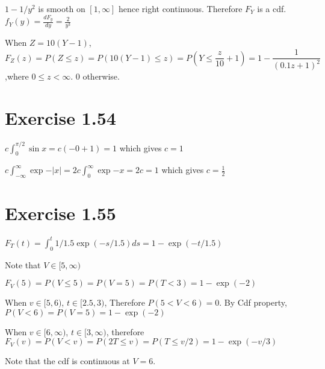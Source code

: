 \documentclass[12pt]{article}
\begin{document}
$1 - 1/y^2$ is smooth on $[1,\infty]$ hence right continuous. Therefore $F_Y$ is a cdf.\\

$f_Y(y) = \frac{d F_y}{dy} = \frac{2}{y^3}$

When $Z=10(Y-1)$, $$F_Z(z) = P(Z\leq z) = P(10(Y-1) \leq z) = P(Y \leq \frac{z}{10} + 1) = 1 - \frac{1}{(0.1z + 1)^2}$$ ,where $0 \leq z < \infty$. 0 otherwise. 

\section*{Exercise 1.54}
$c \int_0^{\pi/2}\sin{x} = c(- 0 + 1) = 1$ which gives $c = 1$

$c \int_{-\infty}^{\infty} \exp{-|x|} = 2c \int_{0}^{\infty}\exp{-x} = 2c  = 1$ which gives $c = \frac{1}{2}$

\section*{Exercise 1.55}
$F_T(t) = \int_{0}^{t} 1/1.5 \exp(-s/1.5)ds = 1 - \exp(-t/1.5)$

Note that $V\in [5, \infty)$

$F_V(5) = P(V \leq 5)= P(V = 5) = P(T < 3) = 1 -\exp(-2)$

When $v \in [5, 6)$,  $t \in [2.5, 3)$, Therefore $P(5 < V < 6) = 0$. By Cdf property, $P(V < 6) = P(V=5) = 1 -\exp(-2)$

When $v \in [6, \infty)$, $t \in [3, \infty)$, therefore $F_V(v) = P(V < v) =  P(2T \leq v) = P(T \leq v/2) = 1 -\exp(-v/3)$

Note that the cdf is continuous at $V=6$.
\end{document}
